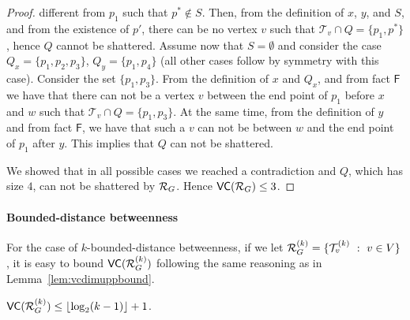 \begin{proof}
  different from $p_1$ such that $p^*\notin S$. Then, from the definition of
  $x$, $y$, and $S$, and from the existence of $p'$, there can be no vertex $v$
  such that $\mathcal{T}_v\cap Q=\{p_1,p^*\}$, hence $Q$ cannot be shattered.
  Assume now that $S=\emptyset$ and consider the case $Q_x=\{p_1,p_2,p_3\}$,
  $Q_y=\{p_1,p_4\}$ (all other cases follow by symmetry with this case).
  Consider the set $\{p_1,p_3\}$. From the definition of $x$ and $Q_x$, and from
  fact $\mathsf{F}$ we have that there can not be a vertex $v$ between the end
  point of $p_1$ before $x$ and $w$ such that $\mathcal{T}_v\cap Q=\{p_1,p_3\}$.
  At the same time, from the definition of $y$ and from fact $\mathsf{F}$, we
  have that such a $v$ can not be between $w$ and the end point of $p_1$ after
  $y$. This implies that $Q$ can not be shattered.

  We showed that in all possible cases we reached a contradiction and $Q$,
  which has size $4$, can not be shattered by $\mathcal{R}_G$. Hence $\mathsf{VC}(\mathcal{R}_G)\le
  3$.
\end{proof}
\fi

\paragraph{Bounded-distance betweenness}
For the case of $k$-bounded-distance betweenness, if we let
$\mathcal{R}_G^{(k)}=\{\mathcal{T}_v^{(k)}~:~ v\in V\}$, it is easy to bound
$\mathsf{VC}(\mathcal{R}_G^{(k)})$ following the same reasoning as in
Lemma~\ref{lem:vcdimuppbound}.
\begin{lemma}\label{lem:vcdimuppboundk}
$\mathsf{VC}(\mathcal{R}_G^{(k)})\le\lfloor\log_2(k-1)\rfloor+1$.
\end{lemma}


